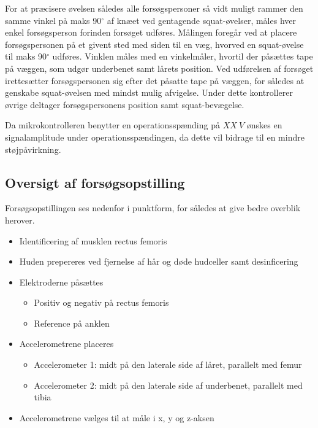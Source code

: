 For at præcisere øvelsen således alle forsøgspersoner så vidt muligt rammer den samme vinkel på maks  90$^{\circ}$ af knæet ved gentagende squat-øvelser, måles hver enkel forsøgsperson forinden forsøget udføres. Målingen foregår ved at placere forsøgspersonen på et givent sted med siden til en væg, hvorved en squat-øvelse til maks 90$^{\circ}$ udføres. Vinklen måles med en vinkelmåler, hvortil der påsættes tape på væggen, som udgør underbenet samt lårets position.
Ved udførelsen af forsøget irettesætter forsøgspersonen sig efter det påsatte tape på væggen, for således at genskabe squat-øvelsen med mindst mulig afvigelse. Under dette kontrollerer øvrige deltager forsøgspersonens position samt squat-bevægelse.

Da mikrokontrolleren benytter en operationsspænding på $XX~V$ ønskes en signalamplitude under operationsspændingen, da dette vil bidrage til en mindre støjpåvirkning. 



\subsection{Oversigt af forsøgsopstilling}
Forsøgsopstillingen ses nedenfor i punktform, for således at give bedre overblik herover. 

\begin{itemize}
\item Identificering af musklen rectus femoris %
\item Huden prepereres ved fjernelse af hår og døde hudceller samt desinficering 
\item Elektroderne påsættes
	\begin{itemize}
	\item Positiv og negativ på rectus femoris
	\item Reference på anklen
	\end{itemize} 
\item Accelerometrene placeres 
	\begin{itemize}
	\item Accelerometer 1: midt på den laterale side af låret, parallelt med femur
	\item Accelerometer 2: midt på den laterale side af underbenet, parallelt med tibia 
	\end{itemize}
\item Accelerometrene vælges til at måle i x, y og z-aksen
\end{itemize}

